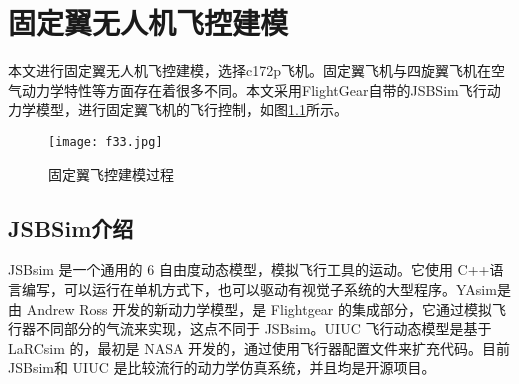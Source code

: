 ﻿\chapter{固定翼无人机飞控建模}\label{routing}
本文进行固定翼无人机飞控建模，选择c172p飞机。固定翼飞机与四旋翼飞机在空气动力学特性等方面存在着很多不同。本文采用FlightGear自带的JSBSim飞行动力学模型，进行固定翼飞机的飞行控制，如图\ref{fig40}所示。
\vspace{-10pt}
\begin{figure}[!ht]
\centering
\texttt{[image: f33.jpg]}
\caption{固定翼飞控建模过程}
\label{fig40}
\end{figure}
\vspace{-10pt}
\section{JSBSim介绍}
JSBsim 是一个通用的 6 自由度动态模型，模拟飞行工具的运动。它使用 C++语言编写，可以运行在单机方式下，也可以驱动有视觉子系统的大型程序。YAsim是由 Andrew Ross 开发的新动力学模型，是 Flightgear 的集成部分，它通过模拟飞行器不同部分的气流来实现，这点不同于 JSBsim。UIUC 飞行动态模型是基于LaRCsim 的，最初是 NASA 开发的，通过使用飞行器配置文件来扩充代码。目前 JSBsim和 UIUC 是比较流行的动力学仿真系统，并且均是开源项目。

